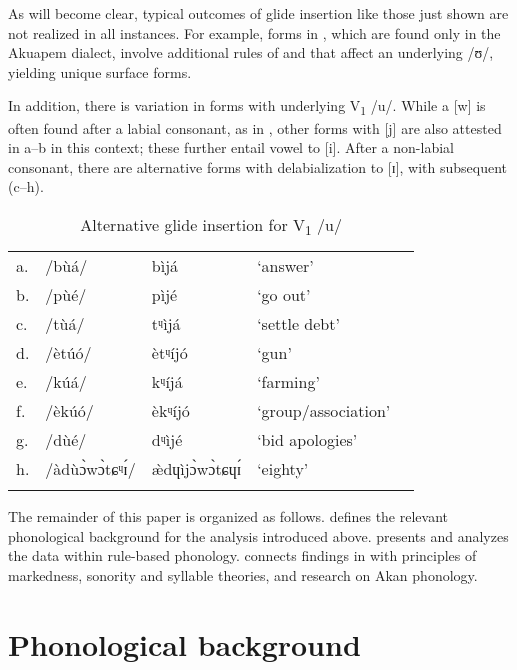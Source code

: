 \documentclass[output=paper,colorlinks,citecolor=brown]{langscibook}
\begin{document}
As will become clear, typical outcomes of glide insertion like those just shown are not realized in all instances. For example, forms in , which are found only in the Akuapem  dialect, involve additional rules of  and  that affect an underlying /ʊ/, yielding unique surface forms. 


In addition, there is variation in forms with underlying V\textsubscript{1} /u/. While a [w] is often found after a labial consonant, as in , other forms with [j] are also attested in a--b in this context; these further entail vowel  to [i]. After a non-labial consonant, there are alternative forms with delabialization to [ɪ], with subsequent  (c--h).

\begin{table}
\caption{Alternative glide insertion for V\textsubscript{1} /u/}
\label{tab:Table7}
 \begin{tabular}{lllll}
  \lsptoprule
a.& /bùá/ &	bìjá	&‘answer’\\
b. &/pùé/&	pìjé&	‘go out’\\
c.& /tùá/	&tᶣìjá 	&	‘settle debt’\\
d.& /ètúó/	&ètᶣíjó 	&	‘gun’\\
e. &/kúá/&	kᶣíjá	&‘farming’\\
f.& /èkúó/&	èkᶣíjó	&	‘group/association’\\
g.& /dùé/&	dᶣìjé&	‘bid apologies’\\
h.& /àdùɔ̀wɔ̀tɕᶣɪ́/	&æ̀dɥìjɔ̀wɔ̀tɕɥɪ́&	‘eighty’\\
  \lspbottomrule
 \end{tabular}
\end{table} 

The remainder of this paper is organized as follows.  defines the relevant phonological background for the analysis introduced above.  presents and analyzes the data within rule-based phonology.  connects findings in  with principles of markedness, sonority and syllable theories, and research on Akan phonology.

\section{Phonological background}\label{02_Section2}\largerpage[2]
\end{document}

